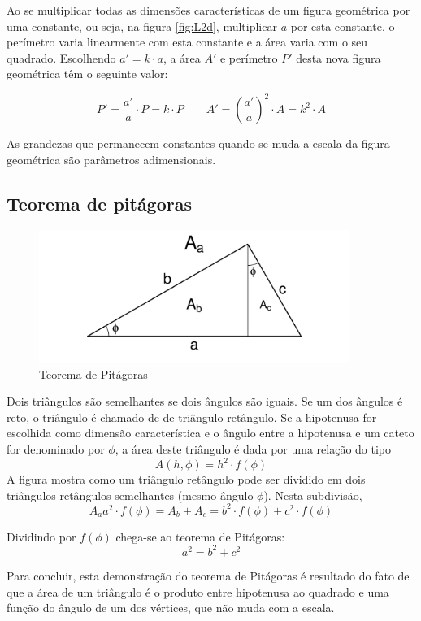 Ao se multiplicar todas as dimensões características de um figura geométrica por uma constante, ou seja, na figura \ref{fig:L2d}, multiplicar $a$ por esta constante, o perímetro varia linearmente com esta constante e a área varia com o seu quadrado. Escolhendo $a'=k\cdot a$, a área $A'$ e perímetro $P'$ desta nova figura geométrica têm o seguinte valor:

\[
P' = \frac{a'}{a}\cdot P = k\cdot P \qquad A' = \left(\frac{a'}{a}\right)^2\cdot A = k^2\cdot A
\]

As grandezas que permanecem constantes quando se muda a escala da figura geométrica são parâmetros adimensionais.

\subsection{Teorema de pitágoras}

\begin{figure}
  \centering
  \includegraphics[width=0.9\textwidth]{./figuras/pitagoras}
  \caption{Teorema de Pitágoras}
  \label{fig:pit}
\end{figure}

Dois triângulos são semelhantes se dois ângulos são iguais. Se um dos ângulos é reto, o triângulo é chamado de de triângulo retângulo. Se a hipotenusa for escolhida como dimensão característica e o ângulo entre a hipotenusa e um cateto for denominado por $\phi$, a área deste triângulo é dada por uma relação do tipo
\[
A(h,\phi) = h^2\cdot f(\phi)
\]
A figura mostra como um triângulo retângulo pode ser dividido em dois triângulos retângulos semelhantes (mesmo ângulo $\phi$). Nesta subdivisão, 
\[
A_a a^2\cdot f(\phi) = A_b + A_c = b^2\cdot f(\phi) + c^2\cdot f(\phi)
\]

Dividindo por $f(\phi)$ chega-se ao teorema de Pitágoras:
\[
a^2 = b^2 + c^2
\]

Para concluir, esta demonstração do teorema de Pitágoras é resultado do fato de que a área de um triângulo é o produto entre hipotenusa ao quadrado e uma função do ângulo de um dos vértices, que não muda com a escala.


